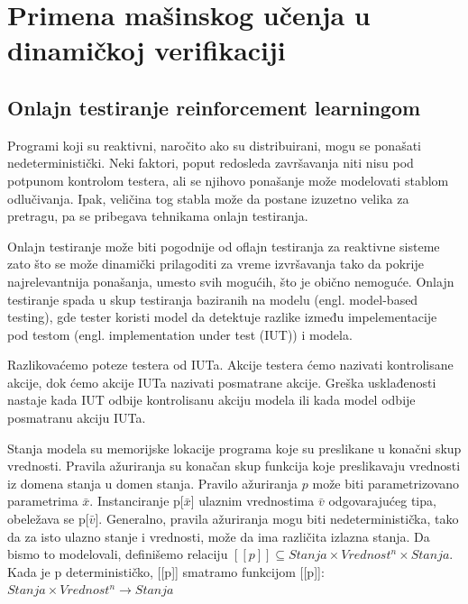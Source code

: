 \documentclass[a4paper]{article}
\begin{document}
\section{Primena mašinskog učenja u dinamičkoj verifikaciji}
\label{sec:dinamcikaPrimena}


\subsection{Onlajn testiranje reinforcement learningom } %


Programi koji su reaktivni, naročito ako su distribuirani, mogu se ponašati nedeterministički. Neki faktori, poput redosleda završavanja niti nisu pod potpunom kontrolom testera, ali se njihovo ponašanje može modelovati stablom odlučivanja. Ipak, veličina tog stabla može da postane izuzetno velika za pretragu, pa se pribegava tehnikama onlajn testiranja. %

Onlajn testiranje može biti pogodnije od oflajn testiranja za reaktivne sisteme zato što se može dinamički prilagoditi za vreme izvršavanja tako da pokrije najrelevantnija ponašanja, umesto svih mogućih, što je obično nemoguće. Onlajn testiranje spada u skup testiranja baziranih na modelu (engl. model-based testing), gde tester koristi model da detektuje razlike između impelementacije pod testom (engl. implementation under test (IUT)) i modela. %

Razlikovaćemo poteze testera od IUTa. Akcije testera ćemo nazivati kontrolisane akcije, dok ćemo akcije IUTa nazivati posmatrane akcije. Greška usklađenosti nastaje kada IUT odbije kontrolisanu akciju modela ili kada model odbije posmatranu akciju IUTa. %

Stanja modela su memorijske lokacije programa koje su preslikane u konačni skup vrednosti. 
Pravila ažuriranja su konačan skup funkcija koje preslikavaju vrednosti iz domena stanja u domen stanja. Pravilo ažuriranja $p$ može biti parametrizovano parametrima $\bar{x}$.
Instanciranje p[$\bar{x}$] ulaznim vrednostima $\bar{v}$ odgovarajućeg tipa, obeležava se p[$\bar{v}$].
Generalno, pravila ažuriranja mogu biti nedeterministička, tako da za isto ulazno stanje i vrednosti, može da ima različita izlazna stanja. Da bismo to modelovali, definišemo relaciju $[[p]] \subseteq Stanja \times Vrednost^n \times Stanja$.
Kada je p determinističko, [[p]] smatramo funkcijom [[p]]: $Stanja \times Vrednost^n  \rightarrow Stanja$
\end{document}
